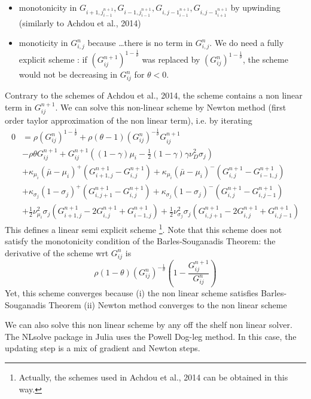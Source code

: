 \documentclass[english]{article}
\begin{document}
\begin{itemize}
	\item monotonicity in $G_{i+1, j}_{i-1}^{n+1}, G_{i-1, j}_{i-1}^{n+1}, G_{i, j-1}_{i-1}^{n+1}, G_{i, j-1}_{i+1}^{n+1}$ by upwinding (similarly to Achdou et al., 2014)
	\item monoticity in $G_{i, j}^{n}$  because \dots there is  no term in $G_{i, j}^{n}$. We do need a fully explicit scheme : if $(G_{ij}^{n+1})^{1-\frac{1}{\theta}}$ was replaced  by $(G_{ij}^{n})^{1-\frac{1}{\theta}}$, the scheme would not be decreasing in $G_{ij}^{n}$ for $\theta < 0$.
\end{itemize}
Contrary to the schemes of Achdou et al., 2014,  the scheme contains a non linear term in $G_{ij}^{n+1}$. We can solve this non-linear scheme by Newton method (first order taylor approximation of the non linear term), i.e. by iterating
\begin{align*}
	0&= \rho (G_{ij}^{n})^{1-\frac{1}{\theta}}+ \rho  (\theta-1) (G_{ij}^{n})^{-\frac{1}{\theta}}G_{ij}^{n+1}\\
	&- \rho \theta G_{ij}^{{n+1}}+G_{ij}^{n+1}((1-\gamma)\mu_i-\frac{1}{2}(1-\gamma)\gamma\nu_D^2\sigma_j)\\
	&+\kappa_{\mu_i}(\bar{\mu}-\mu_i)^+(G_{i+1, j}^{n+1}-G_{i, j}^{n+1}) +\kappa_{\mu_i}(\bar{\mu}-\mu_i)^-(G_{i, j}^{n+1}-G_{i-1, j}^{n+1})\\
	&+\kappa_{\sigma_j}(1-\sigma_j)^+(G_{i, j+1}^{n+1}-G_{i,j}^{n+1}) +\kappa_{\sigma_j}(1-\sigma_j)^-(G_{i, j}^{n+1}-G_{i,j-1}^{n+1})\\
	&+\frac{1}{2}\nu_{\mu_i}^{2}\sigma_j(G_{i+1, j}^{n+1} - 2 G_{i, j}^{n+1} + G_{i-1, j}^{n+1})+\frac{1}{2}\nu_{\sigma_j}^{2}\sigma_j(G_{i, j+1}^{n+1} - 2 G_{i, j}^{n+1} + G_{i, j-1}^{n+1})
\end{align*}
This defines a linear semi explicit scheme \footnote{Actually, the schemes used in Achdou et al., 2014 can be obtained in this way.}. Note that this scheme does not satisfy the monotonicity condition of the Barles-Souganadis Theorem: the derivative of the scheme wrt $G_{ij}^{n}$ is 
$$\rho (1- \theta)(G_{ij}^{n})^{-\frac{1}{\theta}} (1- \frac{G_{ij}^{n+1}}{G_{ij}^{n}})$$
Yet, this scheme converges because (i) the non linear scheme satisfies Barles-Souganadis Theorem (ii) Newton method converges to the non linear scheme


We can also solve this non linear scheme by any off the shelf non linear solver. The NLsolve package in Julia uses the Powell Dog-leg method. In this case, the updating step is a mix of gradient and Newton steps. 
\end{document}
